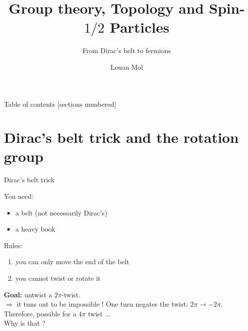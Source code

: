 \documentclass[9pt]{beamer}
\title{Group theory, Topology and Spin-$1/2$ Particles}
\subtitle{From Dirac's belt to fermions}
\date{}
\author{Louan Mol}
\institute{Unversité Libre de Bruxelles\\[2cm]{\small Brussels Summer School of Mathematics 2022}}
\renewcommand{\emph}{\alert}
\begin{document}
\maketitle

\nocite{*}

\begin{frame}{Table of contents}
    [sections numbered]
    \tableofcontents%
\end{frame}

\section{Dirac's belt trick and the rotation group}

\begin{frame}{Dirac's belt trick}
    
    You need:
    \begin{itemize}
        \item a belt (not necessarily Dirac's)
        \item a heavy book
    \end{itemize}
    Rules:
    \begin{enumerate}
        \item you can only move the end of the belt
        \item you cannot twist or rotate it
    \end{enumerate}
    \textbf{Goal:} untwist a $2\pi$-twist.\\[0.5cm]
    $\Rightarrow$ it tuns out to be \emph{impossible} ! One turn negates the twist: $2\pi\to-2\pi$. \\[0.5cm]

    Therefore, possible for a $4\pi$ twist ...\\ \hspace{7cm} Why is that ?

\end{frame}
\end{document}

